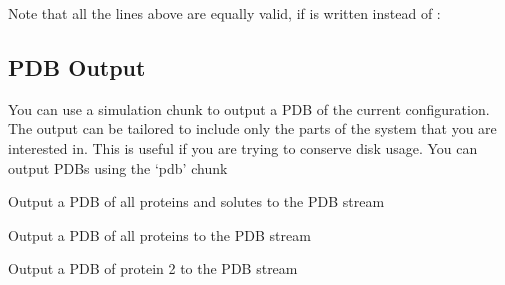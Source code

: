 \documentclass[letterpaper,10pt,english]{sphinxmanual}
\begin{document}
Note that all the  lines above are equally valid, if  is written instead of :

%
\begin{sphinxVerbatim}[commandchars=\\\{\}]
   
\end{sphinxVerbatim}


\subsection{PDB Output}
\label{\detokenize{protoms:pdb-output}}
\ignorespaces 
You can use a simulation chunk to output a PDB of the current configuration. The output can be tailored to include only the parts of the system that you are interested in. This is useful if you are trying to conserve disk usage. You can output PDBs using the ‘pdb’ chunk

%
\begin{sphinxVerbatim}[commandchars=\\\{\}]
  
\end{sphinxVerbatim}

Output a PDB of all proteins and solutes to the PDB stream

%
\begin{sphinxVerbatim}[commandchars=\\\{\}]
  
\end{sphinxVerbatim}

Output a PDB of all proteins to the PDB stream

%
\begin{sphinxVerbatim}[commandchars=\\\{\}]
  
\end{sphinxVerbatim}

Output a PDB of protein 2 to the PDB stream

%
\begin{sphinxVerbatim}[commandchars=\\\{\}]
  
\end{sphinxVerbatim}
\end{document}
